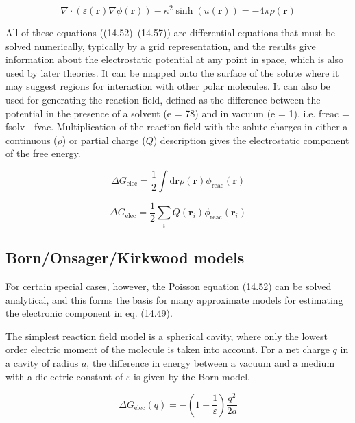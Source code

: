 \[
\nabla\cdot(\varepsilon(\mathbf{r})\nabla\phi(\mathbf{r}))-\kappa^{2}\sinh\left(u(\mathbf{r})\right)=-4\pi\rho(\mathbf{r})
\]


All of these equations ((14.52)–(14.57)) are differential equations
that must be solved numerically, typically by a grid representation,
and the results give information about the electrostatic potential
at any point in space, which is also used by later theories. It can
be mapped onto the surface of the solute where it may suggest regions
for interaction with other polar molecules. It can also be used for
generating the reaction field, defined as the difference between the
potential in the presence of a solvent (e = 78) and in vacuum (e =
1), i.e. freac = fsolv - fvac. Multiplication of the reaction field
with the solute charges in either a continuous ($\rho$) or partial
charge ($Q$) description gives the electrostatic component of the
free energy.

\begin{equation}
\Delta G_{\mathrm{elec}}=\frac{1}{2}\int\mathrm{d}\mathbf{r}\rho(\mathbf{r})\phi_{\mathrm{reac}}(\mathbf{r})
\end{equation}


\begin{equation}
\Delta G_{\mathrm{elec}}=\frac{1}{2}\sum_{i}Q(\mathbf{r}_{i})\phi_{\mathrm{reac}}(\mathbf{r}_{i})
\end{equation}



\subsection{Born/Onsager/Kirkwood models }

For certain special cases, however, the Poisson equation (14.52) can
be solved analytical, and this forms the basis for many approximate
models for estimating the electronic component in eq. (14.49).

The simplest reaction field model is a spherical cavity, where only
the lowest order electric moment of the molecule is taken into account.
For a net charge $q$ in a cavity of radius $a$, the difference in
energy between a vacuum and a medium with a dielectric constant of
$\varepsilon$ is given by the Born model.

\begin{equation}
\Delta G_{\mathrm{elec}}(q)=-\left(1-\frac{1}{\varepsilon}\right)\frac{q^{2}}{2a}
\end{equation}


